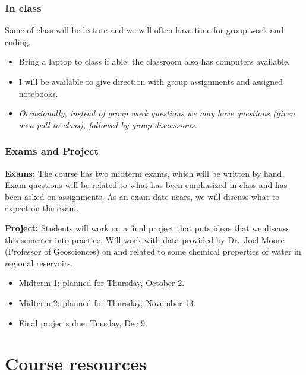 \documentclass{beamer}
\theoremstyle{example}
\begin{document}
\begin{frame}
\frametitle{In class}
Some of class will be lecture and we will often have time for group work and coding.
\vspace*{12pt}
\begin{itemize}
    \pause
    \item Bring a laptop to class if able; the classroom also has computers available.
    \item I will be available to give direction with group assignments and assigned notebooks.
    \pause
    \item \textit{Occasionally, instead of group work questions we may have questions (given as a poll to class), followed by group discussions.}
\end{itemize}
\end{frame}

\begin{frame}
\frametitle{Exams and Project}
\textbf{Exams:} The course has two midterm exams, which will be written by hand. Exam questions will be related to what has been emphasized in class and has been asked on assignments. \newline 
\pause
As an exam date nears, we will discuss what to expect on the exam. 

\vspace*{12pt}
\pause
\textbf{Project:} Students will work on a final project that puts ideas that we discuss this semester into practice. Will work with data provided by Dr.~Joel Moore (Professor of Geosciences) on and related to some chemical properties of water in regional reservoirs. 

\vspace*{12pt}
\pause
\begin{itemize}
    \item Midterm 1: planned for Thursday, October 2.
    \item Midterm 2: planned for Thursday, November 13.
    \item Final projects due: Tuesday, Dec 9.
\end{itemize}
\end{frame}

\section{Course resources}
\end{document}

